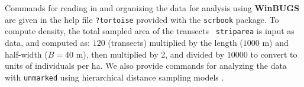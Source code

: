 Commands for reading in and organizing the data for analysis using {\bf
  WinBUGS} are given in the help file \mbox{\tt ?tortoise} provided
with the \mbox{\tt scrbook} package. 
To compute density, the total sampled area of the transects \mbox{\tt
  striparea} is input as data, and computed as: $120$ (transects)
multiplied by the length ($1000$ m) and half-width ($B=40$ m), then
multiplied by 2, and  divided by $10000$ to convert to
units of individuals per ha. 
We also provide commands for 
analyzing the data with \mbox{\tt unmarked}
\citep{fiske_chandler:2011} using hierarchical distance sampling
models \citep{royle_etal:2004}.

